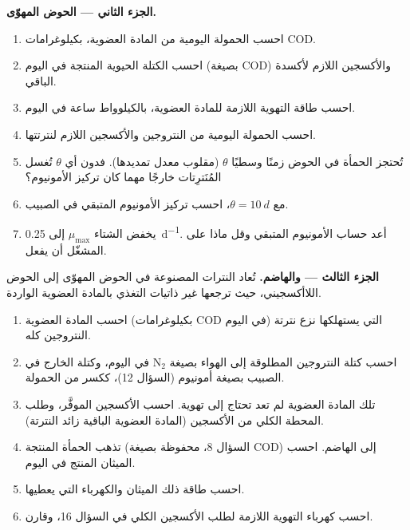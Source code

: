 \begin{problem}
\medskip
\noindent\textbf{الجزء الثاني --- الحوض المهوّى.}
\begin{enumerate}[resume]
  \item احسب الحمولة اليومية من المادة العضوية، بكيلوغرامات COD.
  \item احسب الكتلة الحيوية المنتجة في اليوم (بصيغة COD)
        والأكسجين اللازم لأكسدة الباقي.
  \item احسب طاقة التهوية اللازمة للمادة العضوية، بالكيلوواط ساعة
        في اليوم.
  \item احسب الحمولة اليومية من النتروجين والأكسجين اللازم
        لنترتتها.
  \item تُحتجز الحمأة في الحوض زمنًا وسطيًا $\theta$ (مقلوب معدل
        تمديدها). فدون أي $\theta$ تُغسل المُنَترِتات خارجًا مهما
        كان تركيز الأمونيوم؟
  \item مع $\theta = \qty{10}{d}$، احسب تركيز الأمونيوم المتبقي في
        الصبيب.
  \item يخفض الشتاء $\mu_{\max}$ إلى \qty{0.25}{d^{-1}}. أعد حساب
        الأمونيوم المتبقي وقل ماذا على المشغّل أن يفعل.
\end{enumerate}

\medskip
\noindent\textbf{الجزء الثالث ---  والهاضم.}
تُعاد النترات المصنوعة في الحوض المهوّى إلى الحوض اللاأكسجيني، حيث
ترجعها غير ذاتيات التغذي بالمادة العضوية الواردة.
\begin{enumerate}[resume]
  \item احسب المادة العضوية (بكيلوغرامات COD في اليوم) التي
        يستهلكها نزع نترتة النتروجين كله.
  \item احسب كتلة النتروجين المطلوقة إلى الهواء بصيغة
        $\mathrm{N_2}$ في اليوم، وكتلة الخارج في الصبيب بصيغة
        أمونيوم (السؤال 12)، ككسر من الحمولة.
  \item تلك المادة العضوية لم تعد تحتاج إلى تهوية. احسب الأكسجين
        الموفَّر، وطلب المحطة الكلي من الأكسجين (المادة العضوية
        الباقية زائد النترتة).
  \item تذهب الحمأة المنتجة (السؤال 8، محفوظة بصيغة COD) إلى
        الهاضم. احسب الميثان المنتج في اليوم.
  \item احسب طاقة ذلك الميثان والكهرباء التي يعطيها.
  \item احسب كهرباء التهوية اللازمة لطلب الأكسجين الكلي في السؤال
        16، وقارن.
\end{enumerate}


\end{problem}
